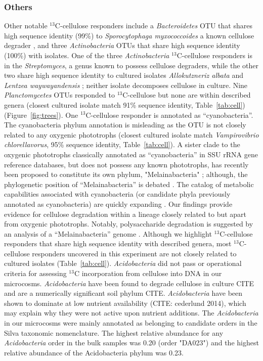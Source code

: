 \subsubsection{Others}\label{cell:others}
Other notable $^{13}$C-cellulose responders include a \textit{Bacteroidetes}
OTU that shares high sequence identity (99\%) to \textit{Sporocytophaga
myxococcoides} a known cellulose degrader \citep{Vance_1980}, and three
\textit{Actinobacteria} OTUs that share high sequence identity (100\%) with
isolates. One of the three \textit{Actinobacteria}
$^{13}$C-cellulose responders is in the \textit{Streptomyces}, a genus known to
possess cellulose degraders, while the other two share high sequence identity
to cultured isolates \textit{Allokutzneriz albata} \citep{Labeda_2008,
Tomita_1993} and \textit{Lentzea waywayandensis} \citep{LABEDA_1989,
Labeda_2001}; neither isolate decomposes cellulose in culture. Nine
\textit{Planctomycetes} OTUs responded to $^{13}$C-cellulose but none are within
described genera (closest cultured isolate match 91\% sequence identity,
Table~\ref{tab:cell}) (Figure~\ref{fig:trees}). One
$^{13}$C-cellulose responder is annotated as ``cyanobacteria''.
The cyanobacteria phylum annotation is misleading as the OTU is not closely
related to any oxygenic phototrophs (closest cultured isolate match
\textit{Vampirovibrio chlorellavorus}, 95\% sequence identity,
Table~\ref{tab:cell}). A sister clade to the oxygenic phototrophs classically
annotated as ``cyanobacteria'' in SSU rRNA gene reference databases, but does
not possess any known phototrophs, has recently been proposed to constitute its own
phylum, "Melainabacteria" \citet{Di_Rienzi_2013}; although, the phylogenetic
position of ``Melainabacteria'' is debated \citep{Soo_2014}. The catalog of
metabolic capabilities associated with cyanobacteria (or candidate phyla
previously annotated as cyanobacteria) are quickly expanding
\citep{Di_Rienzi_2013, Soo_2014}. Our findings provide evidence for cellulose
degradation within a lineage closely related to but apart from oxygenic
phototrophs. Notably, polysaccharide degradation is suggested by an analysis of
a ``Melainabacteria'' genome \citep{Di_Rienzi_2013}. Although we highlight
$^{13}$C-cellulose responders that share high sequence identity with described
genera, most $^{13}$C-cellulose responders uncovered in this experiment are not
closely related to cultured isolates (Table~\ref{tab:cell}).
\textit{Acidobacteria} did not pass or operational criteria for assessing
$^{13}$C incorporation from cellulose into DNA in our microcosms. 
\textit{Acidobacteria} have been found to degrade cellulose in culture CITE and
are a numerically significant soil phylum CITE. \textit{Acidobacteria} have
been shown to dominate at low nutrient availability (CITE: cederlund 2014),
which may explain why they were not active upon nutrient additions. 
The \textit{Acidobacteria} in our microcosms were mainly annotated as belonging
to candidate orders in the Silva taxonomic nomenclature. The highest relative
abundance for any \textit{Acidobacteria} order in the bulk samples was 0.20
(order "DA023") and the highest relative abundance of the Acidobacteria phylum
was 0.23.

